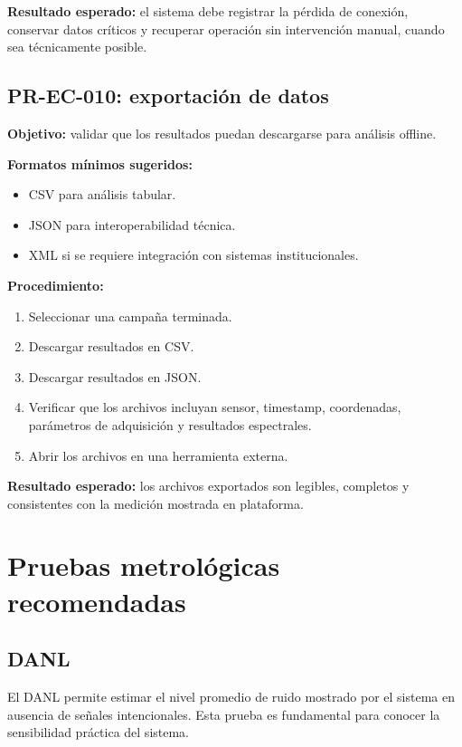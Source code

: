 \textbf{Resultado esperado:} el sistema debe registrar la pérdida de conexión, conservar datos críticos y recuperar operación sin intervención manual, cuando sea técnicamente posible.

\subsection{PR-EC-010: exportación de datos}

\textbf{Objetivo:} validar que los resultados puedan descargarse para análisis offline.

\textbf{Formatos mínimos sugeridos:}

\begin{itemize}
    \item CSV para análisis tabular.
    \item JSON para interoperabilidad técnica.
    \item XML si se requiere integración con sistemas institucionales.
\end{itemize}

\textbf{Procedimiento:}

\begin{enumerate}
    \item Seleccionar una campaña terminada.
    \item Descargar resultados en CSV.
    \item Descargar resultados en JSON.
    \item Verificar que los archivos incluyan sensor, timestamp, coordenadas, parámetros de adquisición y resultados espectrales.
    \item Abrir los archivos en una herramienta externa.
\end{enumerate}

\textbf{Resultado esperado:} los archivos exportados son legibles, completos y consistentes con la medición mostrada en plataforma.

\section{Pruebas metrológicas recomendadas}

\subsection{DANL}

El DANL permite estimar el nivel promedio de ruido mostrado por el sistema en ausencia de señales intencionales. Esta prueba es fundamental para conocer la sensibilidad práctica del sistema.

